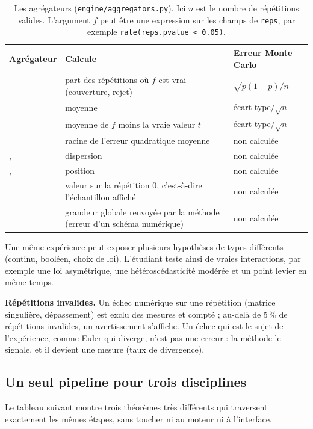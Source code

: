\documentclass[11pt,a4paper]{article}
\begin{document}
\begin{table}[H]
  \centering
  \small
  \begin{tabularx}{\textwidth}{@{}L{3.6cm} Y L{3.8cm}@{}}
    \toprule
    \textbf{Agrégateur} & \textbf{Calcule} & \textbf{Erreur Monte Carlo} \\
    \midrule
     & part des répétitions où $f$ est vrai (couverture, rejet) & $\sqrt{p(1-p)/n}$ \\
     & moyenne & écart type$/\sqrt{n}$ \\
     & moyenne de $f$ moins la vraie valeur $t$ & écart type$/\sqrt{n}$ \\
     & racine de l'erreur quadratique moyenne & non calculée \\
    ,  & dispersion & non calculée \\
    ,  & position & non calculée \\
     & valeur sur la répétition 0, c'est-à-dire l'échantillon affiché & non calculée \\
     & grandeur globale renvoyée par la méthode (erreur d'un schéma numérique) & non calculée \\
    \bottomrule
  \end{tabularx}
  \caption{Les agrégateurs (\texttt{engine/aggregators.py}). Ici $n$ est le nombre de répétitions valides. L'argument $f$ peut être une expression sur les champs de \texttt{reps}, par exemple \texttt{rate(reps.pvalue < 0.05)}.}
\end{table}

Une même expérience peut exposer plusieurs hypothèses de types différents (continu, booléen, choix de loi). L'étudiant teste ainsi de vraies interactions, par exemple une loi asymétrique, une hétéroscédasticité modérée et un point levier en même temps.

\textbf{Répétitions invalides.} Un échec numérique sur une répétition (matrice singulière, dépassement) est exclu des mesures et compté ; au-delà de 5\,\% de répétitions invalides, un avertissement s'affiche. Un échec qui est le sujet de l'expérience, comme Euler qui diverge, n'est pas une erreur : la méthode le signale, et il devient une mesure (taux de divergence).

\subsection{Un seul pipeline pour trois disciplines}
Le tableau suivant montre trois théorèmes très différents qui traversent exactement les mêmes étapes, sans toucher ni au moteur ni à l'interface.
\end{document}

